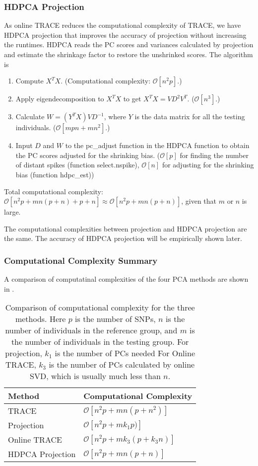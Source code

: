 \documentclass{article}[12pt]
\newcommand{\bO}{\mathcal{O}}
\begin{document}
\subsubsection{HDPCA Projection}

As online TRACE reduces the computational complexity of TRACE,
we have HDPCA projection that improves the accuracy of projection without increasing the runtimes.
HDPCA reads the PC scores and variances calculated by projection and estimate the shrinkage factor to restore the unshrinked scores. 
The algorithm is
\begin{enumerate}
\item Compute $X^T X$.
  (Computational complexity: $\bO[n^2p]$.)  
\item Apply eigendecomposition to $X^T X$ to get $X^T X = V D^2 V^T$.
  ($\bO[n^3]$.)
\item Calculate $W = (Y^T X) V D^{-1}$, where $Y$ is the data matrix for all the testing individuals. ($\bO[mpn + mn^2]$.)
  \item Input $D$ and $W$ to the pc\_adjust function in the HDPCA function to obtain the PC scores adjusted for the shrinking bias. ($\bO[p]$ for finding the number of distant spikes (function select.nspike), $\bO[n]$ for adjusting for the shrinking bias (function hdpc\_est))
\end{enumerate}

Total computational complexity: $\bO[n^2p + mn(p + n) + p + n] \approx \bO[n^2p + mn(p+n)]$,
given that $m$ or $n$ is large.

The computational complexities between projection and HDPCA projection are the same.
The accuracy of HDPCA projection will be empirically shown later.

\subsubsection{Computational Complexity Summary}
A comparison of computatinal complexities of the four PCA methods are shown in .


\begin{table} 
  \centering
  \begin{tabular}{|l|l|}
    \hline
    Method & Computational Complexity \\ 
    \hline
    TRACE & $\bO[n^2 p + mn(p + n^2)]$ \\
    \hline
    Projection & $\bO[n^2p + mk_1p)]$ \\
    \hline
    Online TRACE & $\bO[n^2 p + mk_3(p + k_3 n)]$ \\
    \hline
    HDPCA Projection & $\bO[n^2p + mn(p+n)]$ \\
    \hline
  \end{tabular}
  \caption{
    Comparison of computational complexity for the three methods.
    Here $p$ is the number of SNPs,
    $n$ is the number of individuals in the reference group,
    and $m$ is the number of individuals in the  testing group.
    For projection, $k_1$ is the number of PCs needed
    For Online TRACE, $k_3$ is the number of PCs calculated by online SVD, which is usually much less than $n$.}
  \label{tbl:cplx}
\end{table}
\end{document}
